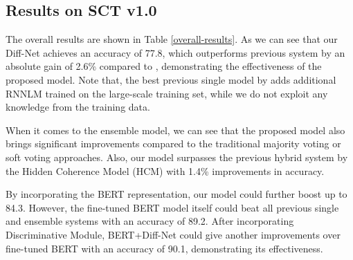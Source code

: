 \documentclass[letterpaper]{article} %
\begin{document}
\subsection{Results on SCT v1.0}
The overall results are shown in Table \ref{overall-results}. 
As we can see that our Diff-Net achieves an accuracy of 77.8, which outperforms previous system by an absolute gain of 2.6\% compared to \citeauthor{schwartz-etal-2017} , demonstrating the effectiveness of the proposed model.
Note that, the best previous single model by \citeauthor{schwartz-etal-2017}  adds additional RNNLM trained on the large-scale training set, while we do not exploit any knowledge from the training data. 

When it comes to the ensemble model, we can see that the proposed model also brings significant improvements compared to the traditional majority voting or soft voting approaches. 
Also, our model surpasses the previous hybrid system by the Hidden Coherence Model (HCM) \cite{chaturvedi-etal-2017} with 1.4\% improvements in accuracy.

By incorporating the BERT representation, our model could further boost up to 84.3.
However, the fine-tuned BERT model itself could beat all previous single and ensemble systems with an accuracy of 89.2.
After incorporating Discriminative Module, BERT+Diff-Net could give another improvements over fine-tuned BERT with an accuracy of 90.1, demonstrating its effectiveness.
\end{document}
